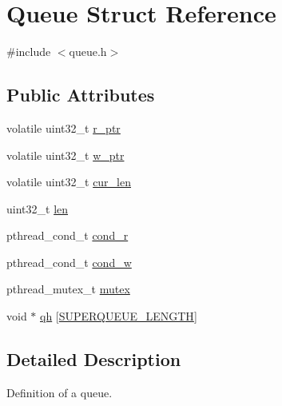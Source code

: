 \hypertarget{structQueue}{\section{\-Queue \-Struct \-Reference}
\label{structQueue}
}


{\ttfamily \#include $<$queue.\-h$>$}

\subsection*{\-Public \-Attributes}
\begin{DoxyCompactItemize}
\item 
volatile uint32\-\_\-t \hyperlink{structQueue_a5c8a29652b60443a047efca289d2c194}{r\-\_\-ptr}
\item 
volatile uint32\-\_\-t \hyperlink{structQueue_ae6233729638e50046b3db9d009a51bdc}{w\-\_\-ptr}
\item 
volatile uint32\-\_\-t \hyperlink{structQueue_a7ad73de52bfdf66f2d56c0bce6fe4946}{cur\-\_\-len}
\item 
uint32\-\_\-t \hyperlink{structQueue_abec35028ccdba58001fb1808ba239cd2}{len}
\item 
pthread\-\_\-cond\-\_\-t \hyperlink{structQueue_a8c115b4b7573549b7d62fa6751e51782}{cond\-\_\-r}
\item 
pthread\-\_\-cond\-\_\-t \hyperlink{structQueue_abb0db2d1ba4873469a2cd8c96421bbfe}{cond\-\_\-w}
\item 
pthread\-\_\-mutex\-\_\-t \hyperlink{structQueue_a3ea818153f3f81669955668e29a3d283}{mutex}
\item 
void $\ast$ \hyperlink{structQueue_ab34d99ddf5ae2378b7650eee04d4d9f6}{qh} \mbox{[}\hyperlink{queue_8h_aab84e0eb025e6efa2a1393459a56275e}{\-S\-U\-P\-E\-R\-Q\-U\-E\-U\-E\-\_\-\-L\-E\-N\-G\-T\-H}\mbox{]}
\end{DoxyCompactItemize}


\subsection{\-Detailed \-Description}
\-Definition of a queue. 

